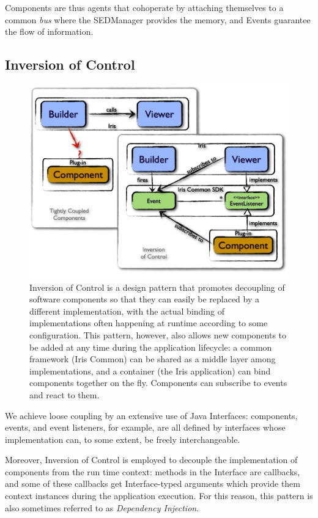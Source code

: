 \documentclass[5p]{elsarticle}
\begin{document}
Components are thus agents that cohoperate by attaching themselves to a common \emph{bus} where the SEDManager provides the memory, and Events guarantee the flow of information.

\subsection{Inversion of Control}

\begin{figure}
\begin{center}
\includegraphics[width=\columnwidth]{figures/IrisDiagrams.002.png}
\caption{Inversion of Control is a design pattern that promotes decoupling of software components so that they can easily be replaced by a different implementation, with the actual binding of implementations often happening at runtime according to some configuration. This pattern, however, also allows new components to be added at any time during the application lifecycle: a common framework (Iris Common) can be shared as a middle layer among implementations, and a container (the Iris application) can bind components together on the fly. Components can subscribe to events and react to them.}
\end{center}
\end{figure}

We achieve loose coupling by an extensive use of Java Interfaces: components, events, and event listeners, for example, are all defined by interfaces whose implementation can, to some extent, be freely interchangeable.

Moreover, Inversion of Control is employed to decouple the implementation of components from the run time context: methods in the Interface are callbacks, and some of these callbacks get Interface-typed arguments which provide them context instances during the application execution. For this reason, this pattern is also sometimes referred to as \emph{Dependency Injection}.
\end{document}
